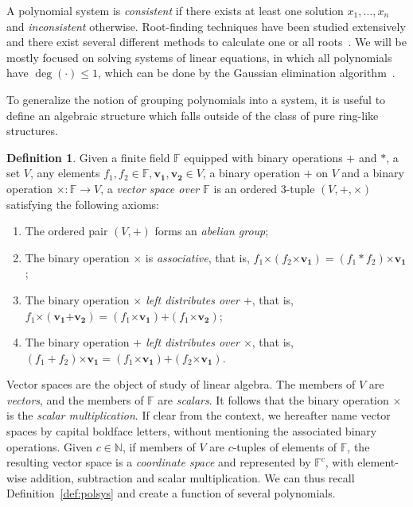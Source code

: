 \documentclass[draft, 12pt, a4paper, oneside]{memoir}
\theoremstyle{definition}
\newtheorem{definition}[theorem]{Definition}
\begin{document}
A polynomial system is \emph{consistent} if there exists at least one solution $x_{1}, \dots, x_{n}$ and \emph{inconsistent} otherwise. Root-finding techniques have been studied extensively and there exist several different methods to calculate one or all roots~\cite[Chapter 9]{Press:2007}. We will be mostly focused on solving systems of linear equations, in which all polynomials have $\deg(\cdot) \leq 1$, which can be done by the Gaussian elimination algorithm~\cite[Section 2.2]{Press:2007}.

To generalize the notion of grouping polynomials into a system, it is useful to define an algebraic structure which falls outside of the class of pure ring-like structures.

\begin{definition}
  Given a finite field $\mathbb{F}$ equipped with binary operations $+$ and $\ast$, a set $V$, any elements $f_{1}, f_{2} \in \mathbb{F}, \mathbf{v_{1}}, \mathbf{v_{2}} \in V$, a binary operation $\bm{+}$ on $V$ and a binary operation $\bm{\times} : \mathbb{F} \to V$, a \emph{vector space over $\mathbb{F}$} is an ordered $3$-tuple $(V, \bm{+}, \bm{\times})$ satisfying the following axioms:
  
  \begin{enumerate}
    \item The ordered pair $(V, \bm{+})$ forms an \emph{abelian group};
    \item The binary operation $\bm{\times}$ is \emph{associative}, that is, $f_{1} \bm{\times} (f_{2} \bm{\times} \mathbf{v_{1}}) = (f_{1} \ast f_{2}) \bm{\times} \mathbf{v_{1}}$;
    \item The binary operation \emph{$\bm{\times}$ left distributes over $\bm{+}$}, that is, $f_{1} \bm{\times} (\mathbf{v_{1}} \bm{+} \mathbf{v_{2}}) = (f_{1} \bm{\times} \mathbf{v_{1}}) \bm{+} (f_{1} \bm{\times} \mathbf{v_{2}})$;
    \item The binary operation \emph{$\bm{+}$ left distributes over $\bm{\times}$}, that is, $(f_{1} + f_{2}) \bm{\times} \mathbf{v_{1}} = (f_{1} \bm{\times} \mathbf{v_{1}}) \bm{+} (f_{2} \bm{\times} \mathbf{v_{1}})$.
  \end{enumerate}
\end{definition}

Vector spaces are the object of study of linear algebra. The members of $V$ are \emph{vectors}, and the members of $\mathbb{F}$ are \emph{scalars}. It follows that the binary operation $\bm{\times}$ is the \emph{scalar multiplication}. If clear from the context, we hereafter name vector spaces by capital boldface letters, without mentioning the associated binary operations. Given $c \in \mathbb{N}$, if members of $V$ are $c$-tuples of elements of $\mathbb{F}$, the resulting vector space is a \emph{coordinate space} and represented by $\mathbb{F}^{c}$, with element-wise addition, subtraction and scalar multiplication. We can thus recall Definition~\ref{def:polsys} and create a function of several polynomials.
\end{document}
